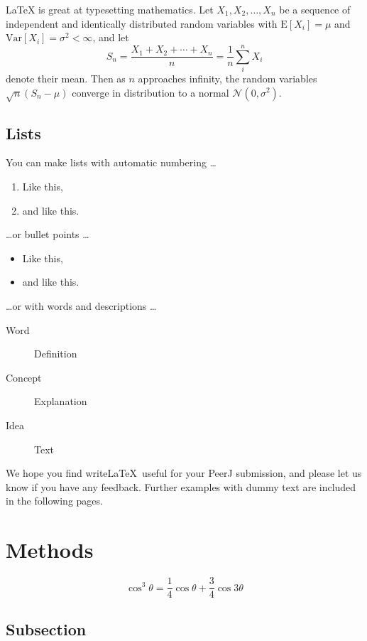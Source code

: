 \documentclass[fleqn,10pt]{wlpeerj}
\begin{document}
\LaTeX{} is great at typesetting mathematics. Let $X_1, X_2, \ldots, X_n$ be a sequence of independent and identically distributed random variables with $\text{E}[X_i] = \mu$ and $\text{Var}[X_i] = \sigma^2 < \infty$, and let
$$S_n = \frac{X_1 + X_2 + \cdots + X_n}{n}
      = \frac{1}{n}\sum_{i}^{n} X_i$$
denote their mean. Then as $n$ approaches infinity, the random variables $\sqrt{n}(S_n - \mu)$ converge in distribution to a normal $\mathcal{N}(0, \sigma^2)$.

\subsection*{Lists}

You can make lists with automatic numbering \dots

\begin{enumerate}[noitemsep]
\item Like this,
\item and like this.
\end{enumerate}
\dots or bullet points \dots
\begin{itemize}[noitemsep]
\item Like this,
\item and like this.
\end{itemize}
\dots or with words and descriptions \dots
\begin{description}
\item[Word] Definition
\item[Concept] Explanation
\item[Idea] Text
\end{description}

We hope you find write\LaTeX\ useful for your PeerJ submission, and please let us know if you have any feedback. Further examples with dummy text are included in the following pages.

\section*{Methods}

\lipsum[4] %

\begin{equation}
\cos^3 \theta =\frac{1}{4}\cos\theta+\frac{3}{4}\cos 3\theta
\label{eq:refname2}
\end{equation}

\lipsum[5] %

\subsection*{Subsection}
\end{document}
